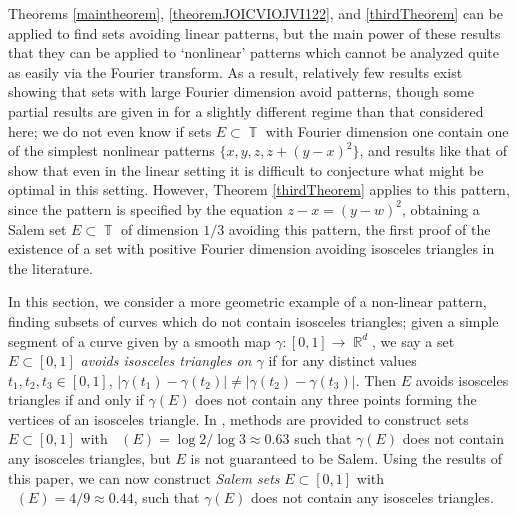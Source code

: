 \documentclass[dvipsnames,letterpaper,12pt]{article}
\numberwithin{equation}{section}
\DeclareMathOperator{\hausdim}{\dim_{\mathbb{H}}}
\DeclareMathOperator{\fordim}{\dim_{\mathbb{F}}}
\DeclareMathOperator{\RR}{\mathbb{R}}
\DeclareMathOperator{\TT}{\mathbb{T}}
\numberwithin{theorem}{section}
\begin{document}
Theorems \ref{maintheorem}, \ref{theoremJOICVIOJVI122}, and \ref{thirdTheorem} can be applied to find sets avoiding linear patterns, but the main power of these results that they can be applied to `nonlinear' patterns which cannot be analyzed quite as easily via the Fourier transform. As a result, relatively few results exist showing that sets with large Fourier dimension avoid patterns, though some partial results are given in \cite{HenriotLabaPramanik} for a slightly different regime than that considered here; we do not even know if sets $E \subset \TT$ with Fourier dimension one contain one of the simplest nonlinear patterns $\{ x, y, z, z + (y - x)^2 \}$, and results like that of \cite{Schmerkin} show that even in the linear setting it is difficult to conjecture what might be optimal in this setting. However, Theorem \ref{thirdTheorem} applies to this pattern, since the pattern is specified by the equation $z - x = (y - w)^2$, obtaining a Salem set $E \subset \TT$ of dimension $1/3$ avoiding this pattern, the first proof of the existence of a set with positive Fourier dimension avoiding isosceles triangles in the literature.

In this section, we consider a more geometric example of a non-linear pattern, finding subsets of curves which do not contain isosceles triangles; given a simple segment of a curve given by a smooth map $\gamma : [0,1] \to \RR^d$, we say a set $E \subset [0,1]$ \emph{avoids isosceles triangles on $\gamma$} if for any distinct values $t_1,t_2,t_3 \in [0,1]$, $|\gamma(t_1) - \gamma(t_2)| \neq |\gamma(t_2) - \gamma(t_3)|$. Then $E$ avoids isosceles triangles if and only if $\gamma(E)$ does not contain any three points forming the vertices of an  isosceles triangle. In \cite{PramanikFraser}, methods are provided to construct sets $E \subset [0,1]$ with $\hausdim(E) = \log 2 / \log 3 \approx 0.63$ such that $\gamma(E)$ does not contain any isosceles triangles, but $E$ is not guaranteed to be Salem. Using the results of this paper, we can now construct \emph{Salem sets} $E \subset [0,1]$ with $\fordim(E) = 4/9 \approx 0.44$, such that $\gamma(E)$ does not contain any isosceles triangles.
\end{document}
